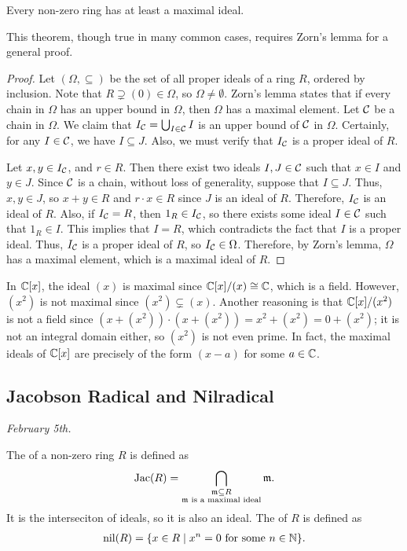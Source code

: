 \begin{theorem}
    Every non-zero ring has at least a maximal ideal.
\end{theorem}
This theorem, though true in many common cases, requires Zorn's lemma for a general proof.
\begin{proof}
    Let $(\Omega, \subseteq)$ be the set of all proper ideals of a ring $R$, ordered by inclusion. Note that $R \supsetneq (0) \in \Omega$, so $\Omega \neq \emptyset$. Zorn's lemma states that if every chain in $\Omega$ has an upper bound in $\Omega$, then $\Omega$ has a maximal element. Let $\mathcal{C}$ be a chain in $\Omega$. We claim that $I_{\mathcal{C}} = \bigcup_{I \in \mathcal{C}} I$ is an upper bound of $\mathcal{C}$ in $\Omega$. Certainly, for any $I \in \mathcal{C}$, we have $I \subseteq J$. Also, we must verify that $I_{\mathcal{C}}$ is a proper ideal of $R$.

    Let $x,y \in I_{\mathcal{C}}$, and $r \in R$. Then there exist two ideals $I,J \in \mathcal{C}$ such that $x \in I$ and $y \in J$. Since $\mathcal{C}$ is a chain, without loss of generality, suppose that $I \subseteq J$. Thus, $x,y \in J$, so $x + y \in R$ and $r \cdot x \in R$ since $J$ is an ideal of $R$. Therefore, $I_{\mathcal{C}}$ is an ideal of $R$. Also, if $I_{\mathcal{C}} = R$, then $1_{R} \in I_{\mathcal{C}}$, so there exists some ideal $I \in \mathcal{C}$ such that $1_{R} \in I$. This implies that $I = R$, which contradicts the fact that $I$ is a proper ideal. Thus, $I_{\mathcal{C}}$ is a proper ideal of $R$, so $I_{\mathcal{C}} \in \Omega$. Therefore, by Zorn's lemma, $\Omega$ has a maximal element, which is a maximal ideal of $R$.
\end{proof}

\begin{example}
    In $\mathbb{C}[x]$, the ideal $(x)$ is maximal since $\mathbb{C}[x]/(x) \cong \mathbb{C}$, which is a field. However, $(x^{2})$ is not maximal since $(x^{2}) \subsetneq (x)$. Another reasoning is that $\mathbb{C}[x]/(x^{2})$ is not a field since $(x + (x^{2})) \cdot (x + (x^{2})) = x^{2} + (x^{2}) = 0 + (x^{2})$; it is not an integral domain either, so $(x^{2})$ is not even prime. In fact, the maximal ideals of $\mathbb{C}[x]$ are precisely of the form $(x - a)$ for some $a \in \mathbb{C}$.
\end{example}

\subsection{Jacobson Radical and Nilradical}
\textit{February 5th.}


\begin{definition}
    The  of a non-zero ring $R$ is defined as
    \begin{align}
        \operatorname{Jac}(R) = \bigcap_{\substack{\mathfrak{m} \subseteq R \\ \mathfrak{m} \text{ is a maximal ideal}}} \mathfrak{m}.
    \end{align}
    It is the interseciton of ideals, so it is also an ideal. The  of $R$ is defined as
    \begin{align}
        \operatorname{nil}(R) = \{x \in R \mid x^{n} = 0 \text{ for some } n \in \mathbb{N}\}.
    \end{align}
\end{definition}



